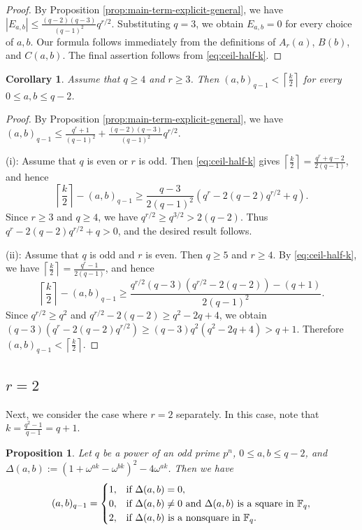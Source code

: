 \documentclass[10pt,a4paper]{article}
\newtheorem{prop}[thm]{Proposition}
\newtheorem{cor}[thm]{Corollary}
\numberwithin{equation}{section}
\begin{document}
\begin{proof}
By Proposition \ref{prop:main-term-explicit-general}, we have $|E_{a,b}|\le \frac{(q-2)(q-3)}{(q-1)^2}q^{r/2}$. Substituting $q=3$, we obtain $E_{a,b}=0$ for every choice of $a,b$. Our formula follows immediately from the definitions of $A_r(a)$, $B(b)$, and $C(a,b)$. The final assertion follows from \eqref{eq:ceil-half-k}.
\end{proof}


\begin{cor}\label{cor:character-sum-half-k-qgefour-rgeqthree}
Assume that $q\ge4$ and $r\ge3$. Then $(a,b)_{q-1}< \left\lceil \frac{k}{2}\right\rceil$ for every $0\le a,b\le q-2$.
\end{cor}

\begin{proof}
By Proposition \ref{prop:main-term-explicit-general}, we have
$(a,b)_{q-1}\le \frac{q^r+1}{(q-1)^2}+\frac{(q-2)(q-3)}{(q-1)^2}q^{r/2}$.

\noindent(i): Assume that $q$ is even or $r$ is odd. Then \eqref{eq:ceil-half-k} gives $\left\lceil \frac{k}{2}\right\rceil=\frac{q^r+q-2}{2(q-1)}$, and hence
\[
\left\lceil \frac{k}{2}\right\rceil-(a,b)_{q-1}
\ge
\frac{q-3}{2(q-1)^2}\left(q^r-2(q-2)q^{r/2}+q\right).
\]
Since $r\ge3$ and $q\ge4$, we have $q^{r/2}\ge q^{3/2}>2(q-2)$. Thus $q^r-2(q-2)q^{r/2}+q>0$, and the desired result follows.

\noindent(ii): Assume that $q$ is odd and $r$ is even. Then $q\ge5$ and $r\ge4$. By \eqref{eq:ceil-half-k}, we have $\left\lceil \frac{k}{2}\right\rceil=\frac{q^r-1}{2(q-1)}$, and hence
\[
\left\lceil \frac{k}{2}\right\rceil-(a,b)_{q-1}
\ge
\frac{q^{r/2}(q-3)\left(q^{r/2}-2(q-2)\right)-(q+1)}{2(q-1)^2}.
\]
Since $q^{r/2}\ge q^2$ and $q^{r/2}-2(q-2)\ge q^2-2q+4$, we obtain
$(q-3)\left(q^r-2(q-2)q^{r/2}\right)\ge (q-3)q^2(q^2-2q+4)>q+1$.
Therefore $(a,b)_{q-1}< \left\lceil \frac{k}{2}\right\rceil$.
\end{proof}


\subsection{$r=2$}\label{subsec:r2-general}
Next, we consider the case where $r=2$ separately. In this case, note that $k=\frac{q^2-1}{q-1}=q+1$.
\begin{prop}\label{prop:r2-discriminant-general}
Let $q$ be a power of an odd prime $p^n$,  $0\le a,b\le q-2$, and $\Delta(a,b):=(1+\omega^{ak}-\omega^{bk})^2-4\omega^{ak}$. Then we have
\[
  (a,b)_{q-1}=
  \begin{cases}
    1, & \textup{if } \Delta(a,b)=0,\\
    0, & \textup{if } \Delta(a,b)\neq 0 \textup{ and } \Delta(a,b) \textup{ is a square in } \mathbb{F}_{q},\\
    2, & \textup{if } \Delta(a,b) \textup{ is a nonsquare in } \mathbb{F}_{q}.
  \end{cases}
\]
\end{prop}
\end{document}
